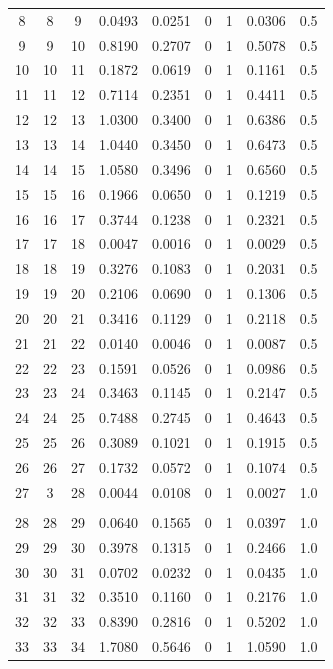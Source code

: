 \begin{longtable}{ccccccccc}
	8 & 8 & 9 & 0.0493 & 0.0251 & 0 & 1 & 0.0306 & 0.5 \\
	
	9 & 9 & 10 & 0.8190 & 0.2707 & 0 & 1 & 0.5078 & 0.5 \\
	10 & 10 & 11 & 0.1872 & 0.0619 & 0 & 1 & 0.1161 & 0.5 \\
	11 & 11 & 12 & 0.7114 & 0.2351 & 0 & 1 & 0.4411 & 0.5 \\
	12 & 12 & 13 & 1.0300 & 0.3400 & 0 & 1 & 0.6386 & 0.5 \\
	13 & 13 & 14 & 1.0440 & 0.3450 & 0 & 1 & 0.6473 & 0.5 \\
	14 & 14 & 15 & 1.0580 & 0.3496 & 0 & 1 & 0.6560 & 0.5 \\
	15 & 15 & 16 & 0.1966 & 0.0650 & 0 & 1 & 0.1219 & 0.5 \\
	16 & 16 & 17 & 0.3744 & 0.1238 & 0 & 1 & 0.2321 & 0.5 \\
	17 & 17 & 18 & 0.0047 & 0.0016 & 0 & 1 & 0.0029 & 0.5 \\
	18 & 18 & 19 & 0.3276 & 0.1083 & 0 & 1 & 0.2031 & 0.5 \\
	19 & 19 & 20 & 0.2106 & 0.0690 & 0 & 1 & 0.1306 & 0.5 \\
	20 & 20 & 21 & 0.3416 & 0.1129 & 0 & 1 & 0.2118 & 0.5 \\
	21 & 21 & 22 & 0.0140 & 0.0046 & 0 & 1 & 0.0087 & 0.5 \\
	22 & 22 & 23 & 0.1591 & 0.0526 & 0 & 1 & 0.0986 & 0.5 \\
	23 & 23 & 24 & 0.3463 & 0.1145 & 0 & 1 & 0.2147 & 0.5 \\
	24 & 24 & 25 & 0.7488 & 0.2745 & 0 & 1 & 0.4643 & 0.5 \\
	25 & 25 & 26 & 0.3089 & 0.1021 & 0 & 1 & 0.1915 & 0.5 \\
	26 & 26 & 27 & 0.1732 & 0.0572 & 0 & 1 & 0.1074 & 0.5 \\
	27 & 3 & 28 & 0.0044 & 0.0108 & 0 & 1 & 0.0027 & 1.0 \\
		\toprule \\
	\hline
	28 & 28 & 29 & 0.0640 & 0.1565 & 0 & 1 & 0.0397 & 1.0 \\
	29 & 29 & 30 & 0.3978 & 0.1315 & 0 & 1 & 0.2466 & 1.0 \\
	30 & 30 & 31 & 0.0702 & 0.0232 & 0 & 1 & 0.0435 & 1.0 \\
	31 & 31 & 32 & 0.3510 & 0.1160 & 0 & 1 & 0.2176 & 1.0 \\
	32 & 32 & 33 & 0.8390 & 0.2816 & 0 & 1 & 0.5202 & 1.0 \\
	33 & 33 & 34 & 1.7080 & 0.5646 & 0 & 1 & 1.0590 & 1.0 \\

\end{longtable}
